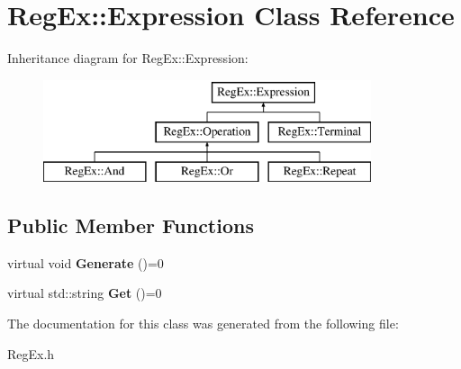 \hypertarget{class_reg_ex_1_1_expression}{}\section{Reg\+Ex\+:\+:Expression Class Reference}
\label{class_reg_ex_1_1_expression}
Inheritance diagram for Reg\+Ex\+:\+:Expression\+:\begin{figure}[H]
\begin{center}
\leavevmode
\includegraphics[height=3.000000cm]{class_reg_ex_1_1_expression}
\end{center}
\end{figure}
\subsection*{Public Member Functions}
\begin{DoxyCompactItemize}
\item 
\mbox{\label{class_reg_ex_1_1_expression_a77ab5c127ba289ba3071134161d3d8f9}} 
virtual void {\bfseries Generate} ()=0
\item 
\mbox{\label{class_reg_ex_1_1_expression_a204f8b3b433b1ed46de48688dcedc140}} 
virtual std\+::string {\bfseries Get} ()=0
\end{DoxyCompactItemize}


The documentation for this class was generated from the following file\+:\begin{DoxyCompactItemize}
\item 
Reg\+Ex.\+h\end{DoxyCompactItemize}
